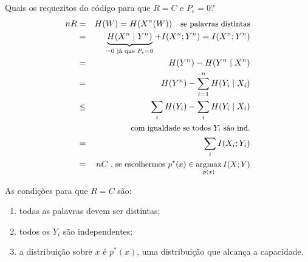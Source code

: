 \begin{frame}[allowframebreaks]
  \framebreak

  Quais os requezitos do código para que $R=C$ e $P_e = 0$?
  \begin{eqnarray}
  nR &=& H(W) = H(X^n(W)) \quad \text{\small se palavras distintas} \nonumber \\
	&=& \underbrace{H(X^n \mid Y^n)}_{=0 \text{ já que }P_e =0} + I(X^n;Y^n) = I(X^n;Y^n) \nonumber \\
	&=& H(Y^n) - H(Y^n \mid X^n) \nonumber \\
	&=& H(Y^n) - \sum_{i=1}^{n} H(Y_i \mid X_i) \nonumber \\
	&\leq& \sum_i H(Y_i) - \sum_i H(Y_i \mid X_i) \nonumber \\
	&& \text{\small com igualdade se todos $Y_i$ são ind.} \nonumber \\
	&=& \sum_i I(X_i;Y_i) \nonumber \\
	&=& nC \text{\small \ , se escolhermos $p^\ast(x) \in \operatorname*{\arg\!\max}_{p(x)} I(X;Y)$}
  \end{eqnarray}

  \framebreak

  As condições para que $R=C$ são:
  \begin{enumerate}
  \item todas as palavras devem ser distintas;
  \item todos os $Y_i$ são independentes;
  \item a distribuição sobre $x$ é $p^\ast(x)$, uma distribuição que alcança a capacidade.
  \end{enumerate} 

\end{frame}


